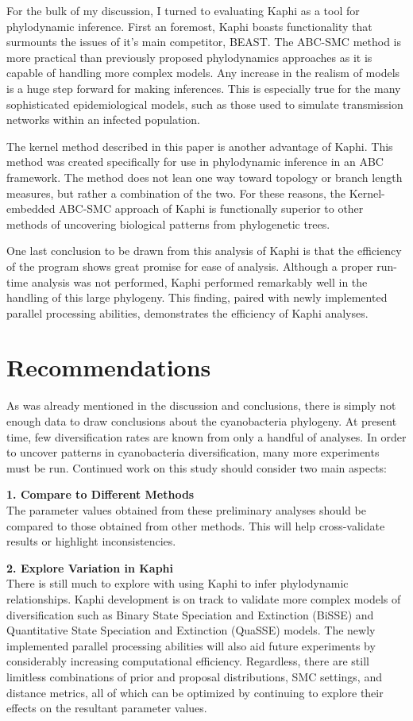 \documentclass[12pt]{article}
\begin{document}
    For the bulk of my discussion, I turned to evaluating Kaphi as a tool for phylodynamic inference. First an foremost, Kaphi boasts functionality that surmounts the issues of it's main competitor, BEAST. The ABC-SMC method is more practical than previously proposed phylodynamics approaches as it is capable of handling more complex models. Any increase in the realism of models is a huge step forward for making inferences. This is especially true for the many sophisticated epidemiological models, such as those used to simulate transmission networks within an infected population.
    
    The kernel method described in this paper is another advantage of Kaphi. This method was created specifically for use in phylodynamic inference in an ABC framework. The method does not lean one way toward topology or branch length measures, but rather a combination of the two. For these reasons, the Kernel-embedded ABC-SMC approach of Kaphi is functionally superior to other methods of uncovering biological patterns from phylogenetic trees.
    
    One last conclusion to be drawn from this analysis of Kaphi is that the efficiency of the program shows great promise for ease of analysis. Although a proper run-time analysis was not performed, Kaphi performed remarkably well in the handling of this large phylogeny. This finding, paired with newly implemented parallel processing abilities, demonstrates the efficiency of Kaphi analyses.
    

\section{ Recommendations}
	As was already mentioned in the discussion and conclusions, there is simply not enough data to draw conclusions about the cyanobacteria phylogeny. At present time, few diversification rates are known from only a handful of analyses. In order to uncover patterns in cyanobacteria diversification, many more experiments must be run. Continued work on this study should consider two main aspects:
    
\textbf{1. Compare to Different Methods}\\
	The parameter values obtained from these preliminary analyses should be compared to those obtained from other methods. This will help cross-validate results or highlight inconsistencies.

\textbf{2. Explore Variation in Kaphi}\\
	There is still much to explore with using Kaphi to infer phylodynamic relationships. Kaphi development is on track to validate more complex models of diversification such as Binary State Speciation and Extinction (BiSSE) and Quantitative State Speciation and Extinction (QuaSSE) models. The newly implemented parallel processing abilities will also aid future experiments by considerably increasing computational efficiency. Regardless, there are still limitless combinations of prior and proposal distributions, SMC settings, and distance metrics, all of which can be optimized by continuing to explore their effects on the resultant parameter values.
\end{document}
